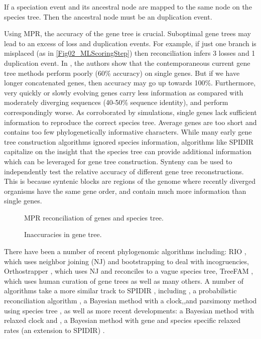 \noindent If a speciation event and its ancestral node are mapped to the same node on the species tree. Then the ancestral node must be an duplication event.

Using MPR, the accuracy of the gene tree is crucial. Suboptimal gene
trees may lead to an excess of loss and duplication events. For
example, if just one branch is misplaced (as in
\ref{Fig02_MLScoringStep}) then reconciliation infers 3 losses and 1
duplication event. In \cite{Rasmussen}, the authors show that the
contemporaneous current gene tree methods perform poorly (60\%
accuracy) on single genes. But if we have longer concatenated genes,
then accuracy may go up towards 100\%. Furthermore, very quickly or
slowly evolving genes carry less information as compared with
moderately diverging sequences (40-50\% sequence identity), and
perform correspondingly worse. As corroborated by simulations, single
genes lack sufficient information to reproduce the correct species
tree. Average genes are too short and contains too few
phylogenetically informative characters. While many early gene tree
construction algorithms ignored species information, algorithms like
SPIDIR capitalize on the insight that the species tree can provide
additional information which can be leveraged for gene tree
construction. Synteny can be used to independently test the relative
accuracy of different gene tree reconstructions. This is because
syntenic blocks are regions of the genome where recently diverged
organisms have the same gene order, and contain much more information
than single genes.

\begin{figure} [ht!] 
  \centering 
  \caption{MPR reconciliation of genes and species tree.}
  \label{Fig18_AlternateReconciliations}
\end{figure} 

\begin{figure} [ht!] 
  \centering 
  \caption{Inaccuracies in gene tree.}
  \label{Fig19_GeneTreeInaccuracies}
\end{figure} 

There have been a number of recent phylogenomic algorithms including:
RIO \cite{Zmasek}, which uses neighbor joining (NJ) and bootstrapping
to deal with incogruencies, Orthostrapper \cite{Storm}, which uses NJ
and reconciles to a vague species tree, TreeFAM \cite{Li}, which uses
human curation of gene trees as well as many others. A number of
algorithms take a more similar track to SPIDIR \cite{Rasmussen},
including \cite{Arvestad}, a probabilistic reconciliation algorithm
\cite{Hollich}, a Bayesian method with a clock,\cite{Wapinski},and
parsimony method using species tree , as well as more recent
developments: \cite{Akerborg} a Bayesian method with relaxed clock and
\cite{Rasmussen2011}, a Bayesian method with gene and species specific
relaxed rates (an extension to SPIDIR) .

